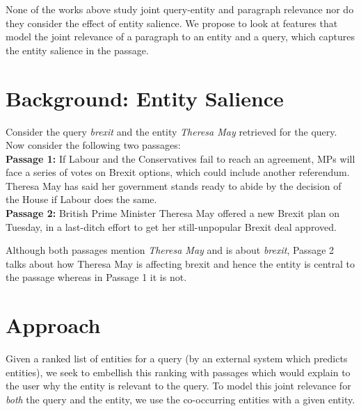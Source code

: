 \documentclass[sigconf]{acmart}
\newcommand{\todo}[1]{ \PackageWarning{TODO:}{#1!}}
\begin{document}
None of the works above study joint query-entity and paragraph relevance nor do they consider the effect of entity salience. We propose to look at features that model the joint relevance of a paragraph to an entity and a query, which captures the entity salience in the passage. 

\section{Background: Entity Salience}
\label{sec: entity salience}
Consider the query \textit{brexit} and the entity \textit{Theresa May} retrieved for the query. Now consider the following two passages: \\
\textbf{Passage 1: }  If Labour and the Conservatives fail to reach an agreement, MPs will face a series of votes on Brexit options, which could include another referendum. Theresa May has said her government stands ready to abide by the decision of the House  if Labour does the same.\\
\textbf{Passage 2: } British Prime Minister Theresa May offered a new Brexit plan on Tuesday, in a last-ditch effort to get her still-unpopular Brexit deal approved.

Although both passages mention \textit{Theresa May} and is about \textit{brexit}, Passage 2 talks about how Theresa May is affecting brexit and hence the entity is central to the passage whereas in Passage 1 it is not.



\section{Approach}
\label{sec:approach}
Given a ranked list of entities for a query (by an external system which predicts entities), we seek to embellish this ranking with passages which would explain to the user why the entity is relevant to the query. To model this joint relevance for \textit{both} the query and the entity, we use the co-occurring entities with a given entity. 
\end{document}
